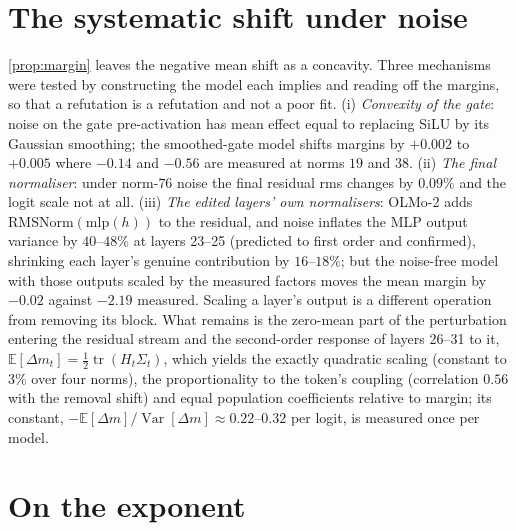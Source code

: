 \documentclass{article}
\theoremstyle{definition}\newtheorem{law}{Empirical law}
\newcommand{\E}{\mathbb{E}}
\DeclareMathOperator{\tr}{tr}
\DeclareMathOperator{\Var}{Var}
\begin{document}
\section{The systematic shift under noise}\label{app:shift}

\cref{prop:margin} leaves the negative mean shift as a concavity. Three mechanisms were tested by constructing the model each implies and reading off the margins, so that a refutation is a refutation and not a poor fit. (i) \emph{Convexity of the gate}: noise on the gate pre-activation has mean effect equal to replacing SiLU by its Gaussian smoothing; the smoothed-gate model shifts margins by $+0.002$ to $+0.005$ where $-0.14$ and $-0.56$ are measured at norms $19$ and $38$. (ii) \emph{The final normaliser}: under norm-$76$ noise the final residual rms changes by $0.09\%$ and the logit scale not at all. (iii) \emph{The edited layers' own normalisers}: OLMo-2 adds $\mathrm{RMSNorm}(\mathrm{mlp}(h))$ to the residual, and noise inflates the MLP output variance by $40$--$48\%$ at layers 23--25 (predicted to first order and confirmed), shrinking each layer's genuine contribution by $16$--$18\%$; but the noise-free model with those outputs scaled by the measured factors moves the mean margin by $-0.02$ against $-2.19$ measured. Scaling a layer's output is a different operation from removing its block. What remains is the zero-mean part of the perturbation entering the residual stream and the second-order response of layers 26--31 to it, $\E[\Delta m_t]=\tfrac12\tr(H_t\Sigma_t)$, which yields the exactly quadratic scaling (constant to $3\%$ over four norms), the proportionality to the token's coupling (correlation $0.56$ with the removal shift) and equal population coefficients relative to margin; its constant, $-\E[\Delta m]/\Var[\Delta m]\approx0.22$--$0.32$ per logit, is measured once per model.

\section{On the exponent}\label{app:exponent}
\end{document}
